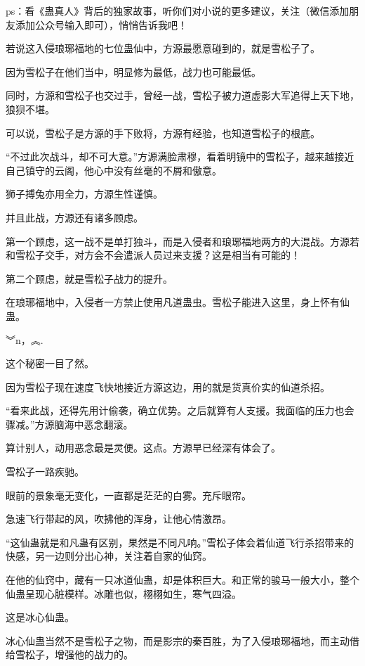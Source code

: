 
\begin{this_body}

ps：看《蛊真人》背后的独家故事，听你们对小说的更多建议，关注（微信添加朋友添加公众号输入即可），悄悄告诉我吧！

若说这入侵琅琊福地的七位蛊仙中，方源最愿意碰到的，就是雪松子了。

因为雪松子在他们当中，明显修为最低，战力也可能最低。

同时，方源和雪松子也交过手，曾经一战，雪松子被力道虚影大军追得上天下地，狼狈不堪。

可以说，雪松子是方源的手下败将，方源有经验，也知道雪松子的根底。

“不过此次战斗，却不可大意。”方源满脸肃穆，看着明镜中的雪松子，越来越接近自己镇守的云阁，他心中没有丝毫的不屑和傲意。

狮子搏兔亦用全力，方源生性谨慎。

并且此战，方源还有诸多顾虑。

第一个顾虑，这一战不是单打独斗，而是入侵者和琅琊福地两方的大混战。方源若和雪松子交手，对方会不会遣派人员过来支援？这是相当有可能的！

第二个顾虑，就是雪松子战力的提升。

在琅琊福地中，入侵者一方禁止使用凡道蛊虫。雪松子能进入这里，身上怀有仙蛊。

︾n，︽.

这个秘密一目了然。

因为雪松子现在速度飞快地接近方源这边，用的就是货真价实的仙道杀招。

“看来此战，还得先用计偷袭，确立优势。之后就算有人支援。我面临的压力也会骤减。”方源脑海中恶念翻滚。

算计别人，动用恶念最是灵便。这点。方源早已经深有体会了。

雪松子一路疾驰。

眼前的景象毫无变化，一直都是茫茫的白雾。充斥眼帘。

急速飞行带起的风，吹拂他的浑身，让他心情激昂。

“这仙蛊就是和凡蛊有区别，果然是不同凡响。”雪松子体会着仙道飞行杀招带来的快感，另一边则分出心神，关注着自家的仙窍。

在他的仙窍中，藏有一只冰道仙蛊，却是体积巨大。和正常的骏马一般大小，整个仙蛊呈现心脏模样。冰雕也似，栩栩如生，寒气四溢。

这是冰心仙蛊。

冰心仙蛊当然不是雪松子之物，而是影宗的秦百胜，为了入侵琅琊福地，而主动借给雪松子，增强他的战力的。


\end{this_body}
